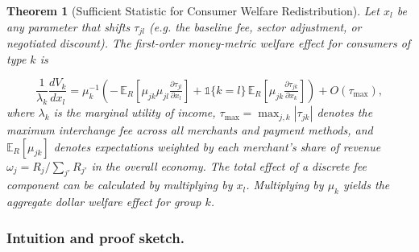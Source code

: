 \documentclass[11pt,english]{article}
\newtheorem{theorem}{Theorem}
\theoremstyle{remark}
\begin{document}
\begin{theorem}[Sufficient Statistic for Consumer Welfare Redistribution]\label{thm:sufficient-stat}
Let $x_l$ be any parameter that shifts $\tau_{jl}$ (e.g. the baseline fee, sector adjustment, or negotiated discount).
The first-order money-metric welfare effect for consumers of type $k$ is

\begin{equation}
\frac{1}{\lambda_k}\frac{dV_k}{dx_l}
= \mu_k^{-1}\!\left(
-\,\mathbb{E}_R\!\left[\mu_{jk}\mu_{jl}\tfrac{\partial\tau_{jl}}{\partial x_l}\right]
+ \mathbb{1}\{k=l\}\,\mathbb{E}_R\!\left[\mu_{jk}\tfrac{\partial\tau_{jk}}{\partial x_k}\right]
\right) + O(\tau_{\max}),
\end{equation}
where $\lambda_k$ is the marginal utility of income, $\tau_{\max} = \max_{j,k} |\tau_{jk}|$ denotes the maximum interchange fee across all merchants and payment methods, and $\mathbb{E}_R\!\left[\mu_{jk}\right]$ denotes expectations weighted by each merchant's share of revenue $\omega_j = R_j / \sum_{j'} R_{j'}$ in the overall economy.
The total effect of a discrete fee component can be calculated by multiplying by $x_l$.
Multiplying by $\mu_k$ yields the aggregate dollar welfare effect for group $k$.

\end{theorem}

\subsubsection{Intuition and proof sketch.}
\end{document}
